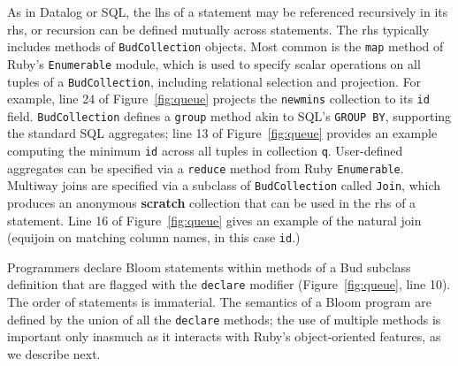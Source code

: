 As in Datalog or SQL, the lhs of a statement may be referenced recursively in its rhs, or recursion can be defined mutually across statements.  The rhs typically includes methods of \texttt{BudCollection} objects.  
Most common is the \texttt{map} method of Ruby's \texttt{Enumerable} module, which is used to specify scalar operations on all tuples of a \texttt{BudCollection}, including relational selection and projection. For example, line 24 of Figure~\ref{fig:queue} projects the \texttt{newmins} collection to its \texttt{id} field.  \texttt{BudCollection} defines a \texttt{group} method akin to SQL's \texttt{GROUP BY}, supporting the standard SQL aggregates; line 13 of Figure~\ref{fig:queue} provides an example computing the minimum \texttt{id} across all tuples in collection \texttt{q}.  User-defined aggregates can be specified via a \texttt{reduce} method from Ruby \texttt{Enumerable}.  Multiway joins are specified via a subclass of \texttt{BudCollection} called \texttt{Join}, which produces an anonymous \textbf{scratch} collection that can be used in the rhs of a statement. Line 16 of Figure~\ref{fig:queue} gives an example of the natural join (equijoin on matching column names, in this case \texttt{id}.)


Programmers declare Bloom statements within methods of a Bud subclass definition that are flagged with the \texttt{declare} modifier (Figure~\ref{fig:queue}, line 10).  The order of statements is immaterial.  The semantics of a Bloom program are defined by the union of all the \texttt{declare} methods; the use of multiple methods is important only inasmuch as it interacts with Ruby's object-oriented features, as we describe next.

